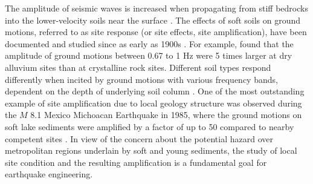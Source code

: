 The amplitude of seismic waves is increased when propagating from stiff bedrocks into the lower-velocity soils near the surface \citep{booreShortperiodSwaveRadiation1986,silvaEngineeringCharacterizationStrong1995}. The effects of soft soils on ground motions, referred to as site response (or site effects, site amplification), have been documented and studied since as early as 1900s . For example, \citet{gutenbergEffectsGroundEarthquake1957} found that the amplitude of ground motions between 0.67 to 1 Hz were 5 times larger at dry alluvium sites than at crystalline rock sites.  Different soil types respond differently when incited by ground motions with various frequency bands, dependent on the depth of underlying soil column \citep{akiLocalSiteEffects1993}. One of the most outstanding example of site amplification due to local geology structure was observed during the $M$ 8.1 Mexico Michoacan Earthquake in 1985, where the ground motions on soft lake sediments were amplified by a factor of up to 50 compared to nearby competent sites \citep{singh1993origin}. In view of the concern about the potential hazard over metropolitan regions underlain by soft and young sediments, the study of local site condition and the resulting amplification is a fundamental goal for earthquake engineering.

